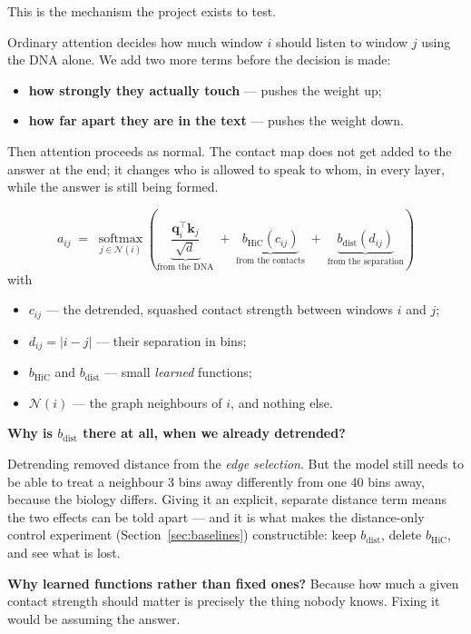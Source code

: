 \documentclass[11pt,a4paper]{article}
\newcommand{\qvec}[1]{\mathbf{q}_{#1}}
\newcommand{\kvec}[1]{\mathbf{k}_{#1}}
\begin{document}
This is the mechanism the project exists to test.

\begin{plainbox}
Ordinary attention decides how much window $i$ should listen to window $j$ using
the DNA alone. We add two more terms before the decision is made:

\begin{itemize}
\item \textbf{how strongly they actually touch} --- pushes the weight up;
\item \textbf{how far apart they are in the text} --- pushes the weight down.
\end{itemize}

Then attention proceeds as normal. The contact map does not get added to the
answer at the end; it changes who is allowed to speak to whom, in every layer,
while the answer is still being formed.
\end{plainbox}

\begin{mathbox}
\begin{equation}
a_{ij} \;=\; \operatorname*{softmax}_{j \in \mathcal{N}(i)}
\left(
\underbrace{\frac{\qvec{i}^\top \kvec{j}}{\sqrt{d}}}_{\text{from the DNA}}
\;+\;
\underbrace{b_{\mathrm{HiC}}(c_{ij})}_{\text{from the contacts}}
\;+\;
\underbrace{b_{\mathrm{dist}}(d_{ij})}_{\text{from the separation}}
\right)
\label{eq:biased-attention}
\end{equation}
with
\begin{itemize}
\item $c_{ij}$ --- the detrended, squashed contact strength between windows $i$ and $j$;
\item $d_{ij} = |i - j|$ --- their separation in bins;
\item $b_{\mathrm{HiC}}$ and $b_{\mathrm{dist}}$ --- small \emph{learned} functions;
\item $\mathcal{N}(i)$ --- the graph neighbours of $i$, and nothing else.
\end{itemize}
\end{mathbox}

\begin{whybox}
\textbf{Why is $b_{\mathrm{dist}}$ there at all, when we already detrended?}

Detrending removed distance from the \emph{edge selection}. But the model still
needs to be able to treat a neighbour 3 bins away differently from one 40 bins
away, because the biology differs. Giving it an explicit, separate distance term
means the two effects can be told apart --- and it is what makes the
distance-only control experiment (Section~\ref{sec:baselines}) constructible:
keep $b_{\mathrm{dist}}$, delete $b_{\mathrm{HiC}}$, and see what is lost.

\smallskip
\textbf{Why learned functions rather than fixed ones?} Because how much a given
contact strength should matter is precisely the thing nobody knows. Fixing it
would be assuming the answer.
\end{whybox}
\end{document}
